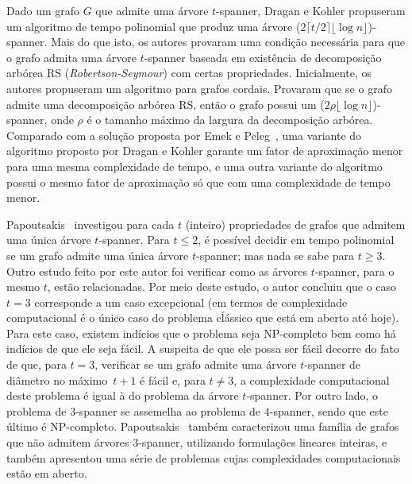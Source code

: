Dado um grafo $G$ que admite uma árvore $t$-spanner, Dragan e Kohler \cite{DraganK2014} propuseram um algoritmo de tempo polinomial que produz uma árvore ($2 \lceil t/2 \rceil \lfloor \log n \rfloor$)-spanner. Mais do que isto, os autores provaram uma condição necessária para que o grafo admita uma árvore $t$-spanner baseada em existência de decomposição arbórea RS (\emph{Robertson-Seymour}) com certas propriedades. 
Inicialmente, os autores propuseram um algoritmo para grafos cordais. 
Provaram que se o grafo admite uma decomposição arbórea RS, então o grafo possui um
($2 \rho \lfloor \log n \rfloor$)-spanner, onde $\rho$ é o tamanho máximo da 
largura da decomposição arbórea. 
Comparado com a solução proposta por Emek e Peleg~\cite{EmekP2008}, uma variante do algoritmo proposto por Dragan e Kohler garante um fator 
de aproximação menor para uma mesma complexidade de tempo, e uma outra 
variante do algoritmo possui o mesmo fator de aproximação só que com uma complexidade de tempo menor.

Papoutsakis~\cite{Papoutsakis2013} investigou para cada $t$ (inteiro) propriedades de grafos que admitem uma única árvore $t$-spanner.  Para $t \le 2$, é possível decidir em tempo polinomial se um grafo admite uma única árvore $t$-spanner; mas nada se sabe para $t \ge 3$. Outro estudo feito por este autor foi verificar como as árvores $t$-spanner, para o mesmo $t$, estão relacionadas. Por meio deste estudo, o autor concluiu que o caso $t = 3$ corresponde a um caso excepcional (em termos de complexidade computacional é o único caso do problema cĺássico que está em aberto até hoje).  Para este caso, existem indícios que o problema seja NP-completo bem como há indícios de que ele seja fácil.  A suspeita de que ele possa ser fácil decorre do fato de que, para $t = 3$, verificar se um grafo admite uma árvore $t$-spanner de diâmetro no máximo~$t+1$ é fácil e, para $t \neq 3$, a complexidade computacional deste problema é igual à do problema da árvore $t$-spanner.  Por outro lado, o problema de $3$-spanner se assemelha ao problema de $4$-spanner, sendo que este último é NP-completo.  Papoutsakis~\cite{Papoutsakis2013} também caracterizou uma família de grafos que não admitem árvores $3$-spanner, utilizando formulações lineares inteiras, e também apresentou uma série de problemas cujas complexidades computacionais estão em aberto.


